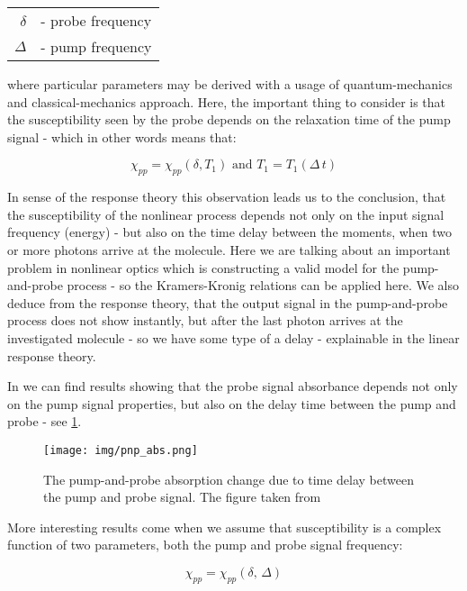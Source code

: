 \documentclass[12pt,twoside,a4paper]{article}
\numberwithin{equation}{subsection}
\numberwithin{figure}{subsection}
\begin{document}
\begin{tabular} {r l}
  $\delta $ & - probe frequency \\
  $\Delta $ & - pump frequency \\
\end{tabular}



where particular parameters may be derived with a usage of quantum-mechanics and classical-mechanics approach. Here,
the important thing to consider is that the susceptibility seen by the probe depends on the relaxation time of the pump signal -
which in other words means that:

\begin{equation} \label{pump_depend}
  \chi_{pp} = \chi_{pp}(\delta, T_{1}) \mbox{ and } T_{1} = T_{1}(\Delta \, t)
\end{equation}

In sense of the response theory this observation leads us to the conclusion, that the susceptibility of the nonlinear process depends not
only on the input signal frequency (energy) - but also on the time delay between the moments, when two or more photons arrive at
the molecule. Here we are talking about an important problem in nonlinear
optics which is constructing a valid model for the pump-and-probe process - so the Kramers-Kronig relations can be applied
here. We also deduce from the response theory, that the output signal in the pump-and-probe process does not show instantly, but after the last
photon arrives at the investigated molecule - so we have some type of a delay - explainable in the linear response
theory.

In \cite{christodoulides_nonlinear} we can find results showing that the probe signal absorbance depends not only on the pump
signal properties, but also on the delay time between the pump and probe - see \ref{fig:pnp_absorption}.

\begin{figure} 
  \texttt{[image: img/pnp\_abs.png]}
  \caption{The pump-and-probe absorption change due to time delay between the pump and probe signal.
  The figure taken from \cite{christodoulides_nonlinear} \label{fig:pnp_absorption} }
\end{figure}

More interesting results come when we assume that susceptibility is a complex function of two parameters, both the pump and
probe signal frequency:

\begin{equation} \label{eq:pnp_2args}
  \chi_{pp} = \chi_{pp}(\delta , \,\Delta )
\end{equation}
\end{document}
